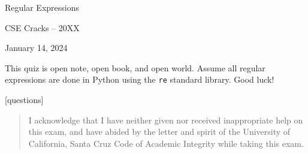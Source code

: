 \documentclass[addpoints]{exam}
\begin{document}
\begin{coverpages}

\centerline{\Large Regular Expressions}
\vspace{0.2cm}

\centerline{\large CSE Cracks -- 20XX}
\centerline{\large January 14, 2024}
\vspace{1.0cm}

This quiz is open note, open book, and open world. Assume all regular expressions are done in Python using the \verb|re| standard library. Good luck!

\vspace{1.0cm}

\begin{center}
    [questions]
\end{center}

\vspace{1.0cm}


\vspace{1.0cm}


\vspace{0.5cm}

\begin{quote}
I acknowledge that I have neither given nor received inappropriate help on this exam, and have abided by the letter and spirit of the University of California, Santa Cruz Code of Academic Integrity  while taking this exam.
\end{quote}

\vspace{1.0cm}


\end{coverpages}
\end{document}

